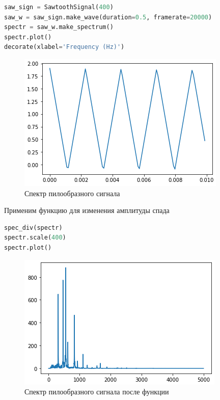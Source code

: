 \begin{lstlisting}[language=Python]
saw_sign = SawtoothSignal(400)
saw_w = saw_sign.make_wave(duration=0.5, framerate=20000)
spectr = saw_w.make_spectrum()
spectr.plot()
decorate(xlabel='Frequency (Hz)')
\end{lstlisting}

\begin{figure}[H]
	\begin{center}
		\includegraphics[scale=1]{fig/lab02/lab2_10.png}
		\caption{Спектр пилообразного сигнала}
	\end{center}
\end{figure}

Применим функцию для изменения амплитуды спада

\begin{lstlisting}[language=Python]
spec_div(spectr)
spectr.scale(400)
spectr.plot()
\end{lstlisting}

\begin{figure}[H]
	\begin{center}
		\includegraphics[scale=1]{fig/lab02/lab2_11.png}
		\caption{Спектр пилообразного сигнала после функции}
	\end{center}
\end{figure}

